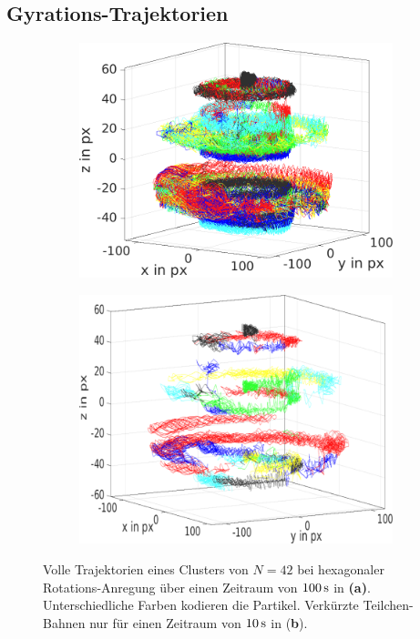 \documentclass[numbers=noenddot,a4paper,notitlepage,twoside,BCOR15mm]{scrbook}
\newcommand{\fett}[1]{\textbf{#1}}
\begin{document}
				\subsection{Gyrations-Trajektorien}\label{sub:gyrat}

						\begin{figure}[!t]
							\begin{subfigure}{0.49\textwidth}
								\centering
								\includegraphics[width=\textwidth,height=0.8\textwidth]{figs/auswertung/trajectoriesrot.png}
								\caption{}\label{img:volltraj}
							\end{subfigure}
							\begin{subfigure}{0.49\textwidth}
								\centering
								\includegraphics[width=\textwidth,height=0.8\textwidth]{figs/auswertung/trajectoriesrotkurz.png}
								\caption{}\label{img:kurztraj}
							\end{subfigure}
							\caption{Volle Trajektorien eines Clusters von $N=42$ bei hexagonaler Rotations-Anregung über einen Zeitraum von $\unit[100]{s}$ in \fett{(a)}. Unterschiedliche Farben kodieren die Partikel. Verkürzte Teilchen-Bahnen nur für einen Zeitraum von $\unit[10]{s}$ in (\fett{b}).}
						\end{figure}
\end{document}

